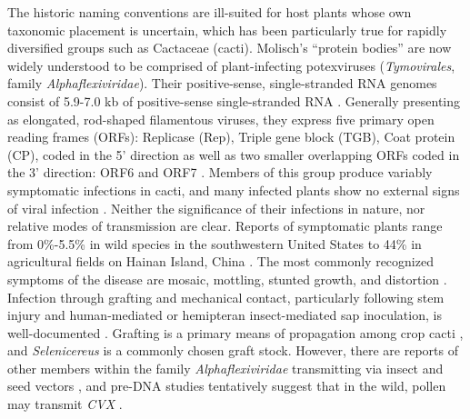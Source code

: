 \documentclass[fleqn,10pt,lineno]{wlpeerj}
\begin{document}
The historic naming conventions are ill-suited for host plants whose own taxonomic placement is uncertain, which has been particularly true for rapidly diversified groups such as Cactaceae (cacti).
Molisch's ``protein bodies'' are now widely understood to be comprised of plant-infecting potexviruses (\textit{Tymovirales}, family \textit{Alphaflexiviridae}).
Their positive-sense, single-stranded RNA genomes consist of 5.9-7.0 kb of positive-sense single-stranded RNA \citep{martelli_family_2007}.
Generally presenting as elongated, rod-shaped filamentous viruses, they express five primary open reading frames (ORFs): Replicase (Rep), Triple gene block (TGB), Coat protein (CP), coded in the 5' direction as well as two smaller overlapping ORFs coded in the 3' direction: ORF6 and ORF7 \citep{martelli_family_2007}. 
Members of this group produce variably symptomatic infections in cacti, and many infected plants show no external signs of viral infection \citep{bos_symptoms_1977, liou_complete_2004}. 
Neither the significance of their infections in nature, nor relative modes of transmission are clear. 
Reports of symptomatic plants range from 0\%-5.5\% in wild species in the southwestern United States \citep{attathom_occurrence_1978} to 44\% in agricultural fields on Hainan Island, China \citep{peng_molecular_2016}.
The most commonly recognized symptoms of the disease are mosaic, mottling, stunted growth, and distortion \citep{attathom_occurrence_1978, maliarenko_cactus_2013, peng_molecular_2016}.
Infection through grafting and mechanical contact, particularly following stem injury and human-mediated or hemipteran insect-mediated sap inoculation, is well-documented \citep{liou_complete_2004,maliarenko_cactus_2013,park_detection_2018}.
Grafting is a primary means of propagation among crop cacti \citep{park_detection_2018}, and \textit{Selenicereus} is a commonly chosen graft stock.
However, there are reports of other members within the family \textit{Alphaflexiviridae} transmitting via insect and seed vectors \citep{martelli_family_2007}, and pre-DNA studies tentatively suggest that in the wild, pollen may transmit \textit{CVX} \citep{attathom_occurrence_1978}.
\end{document}
